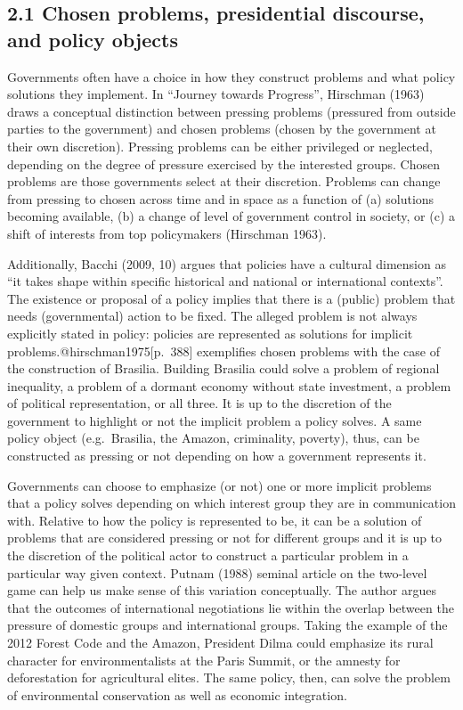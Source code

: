 \documentclass[
]{article}
\begin{document}
\hypertarget{chosen-problems-presidential-discourse-and-policy-objects}{%
\subsection{2.1 Chosen problems, presidential discourse, and policy
objects}\label{chosen-problems-presidential-discourse-and-policy-objects}}

Governments often have a choice in how they construct problems and what
policy solutions they implement. In ``Journey towards Progress'',
Hirschman (1963) draws a conceptual distinction between pressing
problems (pressured from outside parties to the government) and chosen
problems (chosen by the government at their own discretion). Pressing
problems can be either privileged or neglected, depending on the degree
of pressure exercised by the interested groups. Chosen problems are
those governments select at their discretion. Problems can change from
pressing to chosen across time and in space as a function of (a)
solutions becoming available, (b) a change of level of government
control in society, or (c) a shift of interests from top policymakers
(Hirschman 1963).

Additionally, Bacchi (2009, 10) argues that policies have a cultural
dimension as ``it takes shape within specific historical and national or
international contexts''. The existence or proposal of a policy implies
that there is a (public) problem that needs (governmental) action to be
fixed. The alleged problem is not always explicitly stated in policy:
policies are represented as solutions for implicit
problems.@hirschman1975{[}p.~388{]} exemplifies chosen problems with the
case of the construction of Brasilia. Building Brasilia could solve a
problem of regional inequality, a problem of a dormant economy without
state investment, a problem of political representation, or all three.
It is up to the discretion of the government to highlight or not the
implicit problem a policy solves. A same policy object (e.g.~Brasilia,
the Amazon, criminality, poverty), thus, can be constructed as pressing
or not depending on how a government represents it.

Governments can choose to emphasize (or not) one or more implicit
problems that a policy solves depending on which interest group they are
in communication with. Relative to how the policy is represented to be,
it can be a solution of problems that are considered pressing or not for
different groups and it is up to the discretion of the political actor
to construct a particular problem in a particular way given context.
Putnam (1988) seminal article on the two-level game can help us make
sense of this variation conceptually. The author argues that the
outcomes of international negotiations lie within the overlap between
the pressure of domestic groups and international groups. Taking the
example of the 2012 Forest Code and the Amazon, President Dilma could
emphasize its rural character for environmentalists at the Paris Summit,
or the amnesty for deforestation for agricultural elites. The same
policy, then, can solve the problem of environmental conservation as
well as economic integration.
\end{document}
